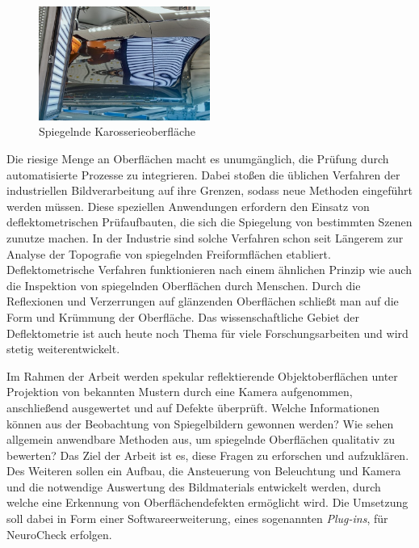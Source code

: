 {
	\begin{figure}[H]
		\centering
		\includegraphics[width=0.5\textwidth]{01_einfuehrung/figures/spiegelndeKarosserie}
		\caption[Spiegelnde Karosserieoberfläche]{Spiegelnde Karosserieoberfläche \cite{spiegelndeKarosserieImg}}
		\label{img:spiegelndeKarosserie}
	\end{figure}
}

\noindent
Die riesige Menge an Oberflächen macht es unumgänglich, die Prüfung durch automatisierte Prozesse zu integrieren.
Dabei stoßen die üblichen Verfahren der industriellen Bildverarbeitung auf ihre Grenzen, sodass neue Methoden eingeführt werden müssen.
Diese speziellen Anwendungen erfordern den Einsatz von deflektometrischen Prüfaufbauten, die sich die Spiegelung von bestimmten Szenen zunutze machen.
In der Industrie sind solche Verfahren schon seit Längerem zur Analyse der Topografie von spiegelnden Freiformflächen etabliert.
Deflektometrische Verfahren funktionieren nach einem ähnlichen Prinzip wie auch die Inspektion von spiegelnden Oberflächen durch Menschen. 
Durch die Reflexionen und Verzerrungen auf glänzenden Oberflächen schließt man auf die Form und Krümmung der Oberfläche.
Das wissenschaftliche Gebiet der Deflektometrie ist auch heute noch Thema für viele Forschungsarbeiten und wird stetig weiterentwickelt.

\p
Im Rahmen der Arbeit werden spekular reflektierende Objektoberflächen unter Projektion von bekannten Mustern durch eine Kamera aufgenommen, anschließend ausgewertet und auf Defekte überprüft.
Welche Informationen können aus der Beobachtung von Spiegelbildern gewonnen werden?
Wie sehen allgemein anwendbare Methoden aus, um spiegelnde Oberflächen qualitativ zu bewerten?
Das Ziel der Arbeit ist es, diese Fragen zu erforschen und aufzuklären.
Des Weiteren sollen ein Aufbau, die Ansteuerung von Beleuchtung und Kamera und die notwendige Auswertung des Bildmaterials entwickelt werden, durch welche eine Erkennung von Oberflächendefekten ermöglicht wird.
Die Umsetzung soll dabei in Form einer Softwareerweiterung, eines sogenannten \textit{Plug-ins}, für NeuroCheck erfolgen.

